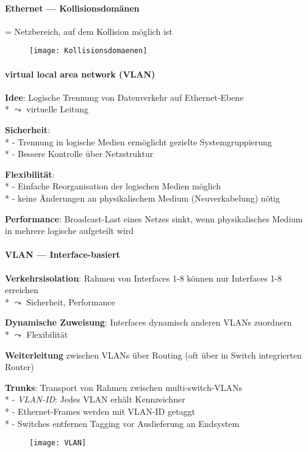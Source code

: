 \paragraph{Ethernet --- Kollisionsdomänen}
\begin{items}
  \item = Netzbereich, auf dem Kollision möglich ist
\end{items}
\begin{figure}[H]\centering\label{Kollisionsdomaenen}\texttt{[image: Kollisionsdomaenen]}\end{figure}

\paragraph{virtual local area network (VLAN)}
\begin{items}
  \item \textbf{Idee}: Logische Trennung von Datenverkehr auf Ethernet-Ebene \\* \( \leadsto \) virtuelle Leitung
  \item \textbf{Sicherheit}: \\*
    - Trennung in logische Medien ermöglicht gezielte Systemgruppierung \\*
    - Bessere Kontrolle über Netzstruktur
  \item \textbf{Flexibilität}: \\*
    - Einfache Reorganisation der logischen Medien möglich \\*
    - keine Änderungen an physikalischem Medium (Neuverkabelung) nötig
  \item \textbf{Performance}: Broadcast-Last eines Netzes sinkt, wenn physikalisches Medium in mehrere logische aufgeteilt wird
\end{items}

\paragraph{VLAN --- Interface-basiert}
\begin{items}
  \item \textbf{Verkehrsisolation}: Rahmen von Interfaces 1-8 können nur Interfaces 1-8 erreichen \\* \( \leadsto \) Sicherheit, Performance
  \item \textbf{Dynamische Zuweisung}: Interfaces dynamisch anderen VLANs zuordnern \\*
    \( \leadsto \) Flexibilität
  \item \textbf{Weiterleitung} zwischen VLANs über Routing (oft über in Switch integrierten Router)
  \item \textbf{Trunks}: Transport von Rahmen zwischen multi-switch-VLANs \\*
    - \emph{VLAN-ID}: Jedes VLAN erhält Kennzeichner \\*
    - Ethernet-Frames werden mit VLAN-ID getaggt \\*
    - Switches entfernen Tagging vor Auslieferung an Endsystem
\end{items}
\begin{figure}[H]\centering\label{VLAN}\texttt{[image: VLAN]}\end{figure}
